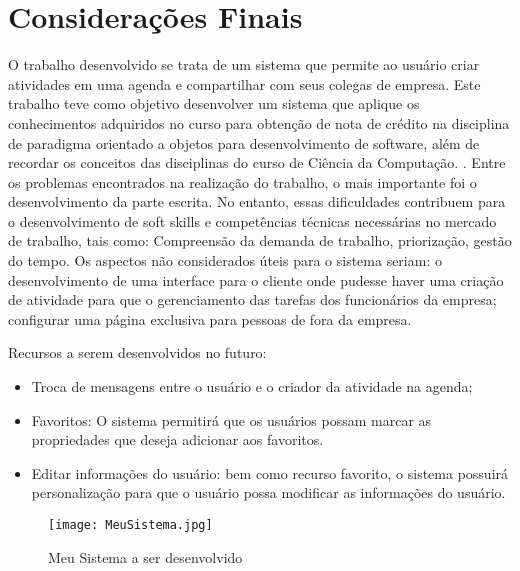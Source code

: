 

\chapter{Considera\c{c}\~{o}es Finais}


O trabalho desenvolvido se trata de um sistema que permite ao usuário criar atividades em uma agenda e compartilhar com seus colegas de empresa.
Este trabalho teve como objetivo desenvolver um sistema que aplique os conhecimentos adquiridos no curso para obtenção de nota de crédito na disciplina de paradigma orientado a objetos para desenvolvimento de software, além de recordar os conceitos das disciplinas do curso de Ciência da Computação.
. Entre os problemas encontrados na realização do trabalho, o mais importante foi o desenvolvimento da parte escrita. No entanto, essas dificuldades contribuem para o desenvolvimento de soft skills e competências técnicas necessárias no mercado de trabalho, tais como: Compreensão da demanda de trabalho, priorização, gestão do tempo. Os aspectos não considerados úteis para o sistema seriam: o desenvolvimento de uma interface para o cliente onde pudesse haver uma criação de atividade para que o gerenciamento das tarefas dos funcionários da empresa; configurar uma página exclusiva para pessoas de fora da empresa.

Recursos a serem desenvolvidos no futuro:
\begin{itemize}
    \item  Troca de mensagens entre o usuário e o criador da atividade na agenda;
    \item  Favoritos: O sistema permitirá que os usuários possam marcar as propriedades que deseja adicionar aos favoritos.
    \item  Editar informações do usuário: bem como recurso favorito, o sistema possuirá personalização para que o usuário possa modificar as informações do usuário.

\end{itemize}



\begin{figure}[H]
    \begin{center}
        \texttt{[image: MeuSistema.jpg]}
        \caption{Meu Sistema a ser desenvolvido} \label{sistema}
    \end{center}
\end{figure}
